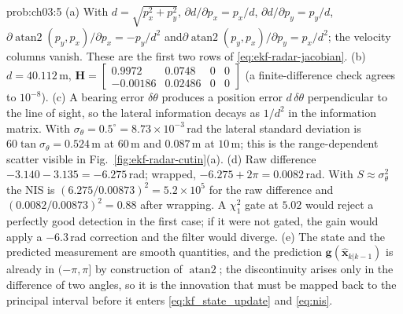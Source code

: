 \documentclass[graybox,envcountchap]{style/SNmono}
\providecommand{\DIFaddbegin}{} %
\providecommand{\DIFaddend}{} %
\begin{document}
\begin{sol}{prob:ch03:5}
(a) With $d=\sqrt{p_x^{2}+p_y^{2}}$, $\partial d/\partial p_x=p_x/d$, $\partial d/\partial p_y=p_y/d$, $\partial\operatorname{atan2}(p_y,p_x)/\partial p_x=-p_y/d^{2}$ and\DIFaddbegin \allowbreak \DIFaddend $\partial\operatorname{atan2}(p_y,p_x)/\partial p_y=p_x/d^{2}$; the velocity columns vanish. These are the first two rows of \eqref{eq:ekf-radar-jacobian}.
(b) $d=40.112$\,m, $\mathbf{H}=\begin{bmatrix}0.9972&0.0748&0&0\\-0.00186&0.02486&0&0\end{bmatrix}$ (a finite-difference check agrees to $10^{-8}$).
(c) A bearing error $\delta\theta$ produces a position error $d\,\delta\theta$ perpendicular to the line of sight, so the lateral information decays as $1/d^{2}$ in the information matrix. With $\sigma_\theta=0.5^{\circ}=8.73\times10^{-3}$\,rad the lateral standard deviation is $60\tan\sigma_\theta=0.524$\,m at $60$\,m and $0.087$\,m at $10$\,m; this is the range-dependent scatter visible in Fig.~\ref{fig:ekf-radar-cutin}(a).
(d) Raw difference $-3.140-3.135=-6.275$\,rad; wrapped, $-6.275+2\pi=0.0082$\,rad. With $S\approx\sigma_\theta^{2}$ the NIS is $(6.275/0.00873)^{2}=5.2\times10^{5}$ for the raw difference and $(0.0082/0.00873)^{2}=0.88$ after wrapping. A $\chi^{2}_{1}$ gate at $5.02$ would reject a perfectly good detection in the first case; if it were not gated, the gain would apply a $-6.3$\,rad correction and the filter would diverge.
(e) The state and the predicted measurement are smooth quantities, and the prediction $\mathbf{g}(\widehat{\mathbf{x}}_{k|k-1})$ is already in $(-\pi,\pi]$ by construction of $\operatorname{atan2}$; the discontinuity arises only in the difference of two angles, so it is the innovation that must be mapped back to the principal interval before it enters \eqref{eq:kf_state_update} and \eqref{eq:nis}.
\end{sol}
\end{document}
